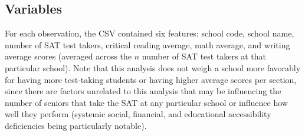 \documentclass[11pt]{article} %
\begin{document}
\subsection*{Variables}
For each observation, the CSV contained six features: school code, school name, number of SAT test takers, critical reading average, math average, and writing average scores (averaged across the $n$ number of SAT test takers at that particular school). Note that this analysis does not weigh a school more favorably for having more test-taking students or having higher average scores per section, since there are factors unrelated to this analysis that may be influencing the number of seniors that take the SAT at any particular school or influence how well they perform (systemic social, financial, and educational accessibility deficiencies being particularly notable).
\end{document}
